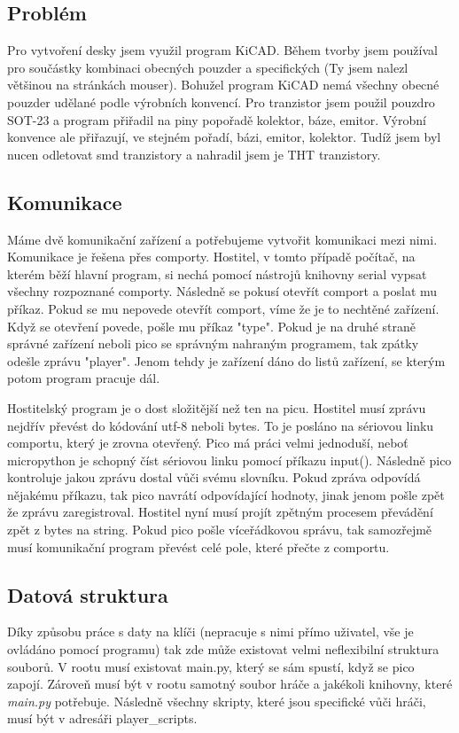 \documentclass[12pt,a4paper]{article}
\begin{document}
\subsection{Problém}
Pro vytvoření desky jsem využil program KiCAD. Během tvorby jsem používal pro součástky kombinaci obecných pouzder a specifických (Ty jsem nalezl většinou na stránkách mouser). Bohužel program KiCAD nemá všechny obecné pouzder udělané podle výrobních konvencí. Pro tranzistor jsem použil pouzdro SOT-23 a program přiřadil na piny popořadě kolektor, báze, emitor. Výrobní konvence ale přiřazují, ve stejném pořadí, bázi, emitor, kolektor. Tudíž jsem byl nucen odletovat smd tranzistory a nahradil jsem je THT tranzistory. 

\subsection{Komunikace}
Máme dvě komunikační zařízení a potřebujeme vytvořit komunikaci mezi nimi. Komunikace je řešena přes comporty. Hostitel, v tomto případě počítač, na kterém běží hlavní program, si nechá pomocí nástrojů knihovny serial vypsat všechny rozpoznané comporty. Následně se pokusí otevřít comport a poslat mu příkaz. Pokud se mu nepovede otevřít comport, víme že je to nechtěné zařízení. Když se otevření povede, pošle mu příkaz "type". Pokud je na druhé straně správné zařízení neboli pico se správným nahraným programem, tak zpátky odešle zprávu "player". Jenom tehdy je zařízení dáno do listů zařízení, se kterým potom program pracuje dál.

Hostitelský program je o dost složitější než ten na picu. Hostitel musí zprávu nejdřív převést do kódování utf-8 neboli bytes. To je posláno na sériovou linku comportu, který je zrovna otevřený. Pico má práci velmi jednoduší, neboť micropython je schopný číst sériovou linku pomocí příkazu input(). Následně pico kontroluje jakou zprávu dostal vůči svému slovníku. Pokud zpráva odpovídá nějakému příkazu, tak pico navrátí odpovídající hodnoty, jinak jenom pošle zpět že zprávu zaregistroval. Hostitel nyní musí projít zpětným procesem převádění zpět z bytes na string. Pokud pico pošle víceřádkovou správu, tak samozřejmě musí komunikační program převést celé pole, které přečte z comportu. 

\subsection{Datová struktura}
Díky způsobu práce s daty na klíči (nepracuje s nimi přímo uživatel, vše je ovládáno pomocí programu) tak zde může existovat velmi neflexibilní struktura souborů. V rootu musí existovat main.py, který se sám spustí, když se pico zapojí. Zároveň musí být v rootu samotný soubor hráče a jakékoli knihovny, které \textit{main.py} potřebuje. Následně všechny skripty, které jsou specifické vůči hráči, musí být v adresáři player\_scripts.
\end{document}
